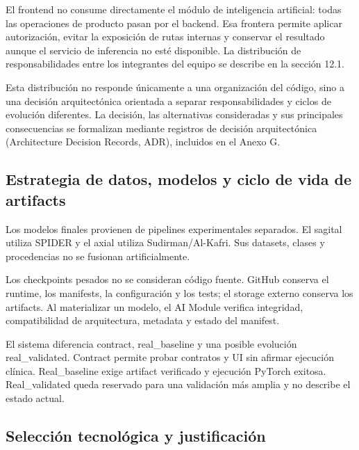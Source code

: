 El frontend no consume directamente el módulo de inteligencia artificial: todas las operaciones de producto pasan por el backend. Esa frontera permite aplicar autorización, evitar la exposición de rutas internas y conservar el resultado aunque el servicio de inferencia no esté disponible. La distribución de responsabilidades entre los integrantes del equipo se describe en la sección 12.1.

Esta distribución no responde únicamente a una organización del código, sino a una decisión arquitectónica orientada a separar responsabilidades y ciclos de evolución diferentes. La decisión, las alternativas consideradas y sus principales consecuencias se formalizan mediante registros de decisión arquitectónica (Architecture Decision Records, ADR), incluidos en el Anexo G.

\subsection{Estrategia de datos, modelos y ciclo de vida de artifacts}

Los modelos finales provienen de pipelines experimentales separados. El sagital utiliza SPIDER y el axial utiliza Sudirman/Al-Kafri. Sus datasets, clases y procedencias no se fusionan artificialmente.


Los checkpoints pesados no se consideran código fuente. GitHub conserva el runtime, los manifests, la configuración y los tests; el storage externo conserva los artifacts. Al materializar un modelo, el AI Module verifica integridad, compatibilidad de arquitectura, metadata y estado del manifest.

El sistema diferencia contract, real\_baseline y una posible evolución real\_validated. Contract permite probar contratos y UI sin afirmar ejecución clínica. Real\_baseline exige artifact verificado y ejecución PyTorch exitosa. Real\_validated queda reservado para una validación más amplia y no describe el estado actual.

\subsection{Selección tecnológica y justificación}

